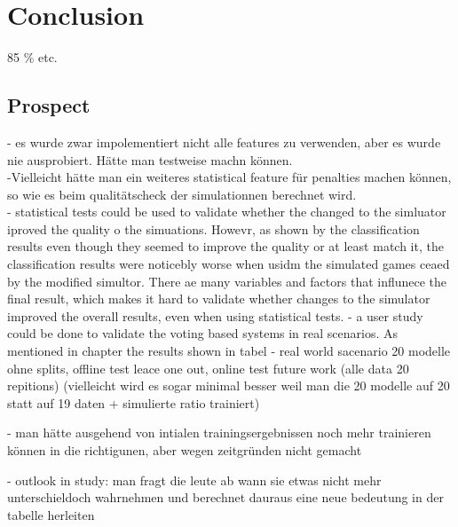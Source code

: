 \chapter{Conclusion}
85 \% etc.  

\section{Prospect}
- es wurde zwar impolementiert nicht alle features zu verwenden, aber es wurde nie ausprobiert. Hätte man testweise machn können. \\
-Vielleicht hätte man ein weiteres statistical feature für penalties machen können, so wie es beim qualitätscheck der simulationnen berechnet wird.\\
- statistical tests could be used to validate whether the changed to the simluator iproved the quality o the simuations. Howevr, as shown by the classification results even though they seemed to improve the quality or at least match it, the classification results were noticebly worse when usidm the simulated games ceaed by the modified simultor. There ae many variables and factors that influnece the final result, which makes it hard to validate whether changes to the simulator improved the overall results, even when using statistical tests. 
- a user study could be done to validate the voting based systems in real scenarios. As mentioned in chapter  the results shown in tabel  
- real world sacenario 20 modelle ohne splits, offline test leace one out, online test future work (alle data 20 repitions) (vielleicht wird es sogar minimal besser weil man die 20 modelle auf 20 statt auf 19 daten + simulierte ratio trainiert)

- man hätte ausgehend von intialen trainingsergebnissen noch mehr trainieren können in die richtigunen, aber wegen zeitgründen nicht gemacht 


- outlook in study: man fragt die leute ab wann sie etwas nicht 
mehr unterschieldoch wahrnehmen und berechnet dauraus eine neue bedeutung in der tabelle herleiten 

